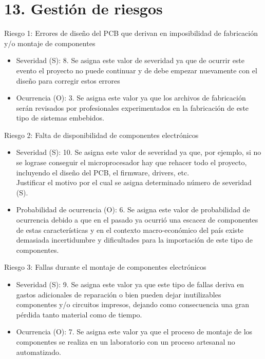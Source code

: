 \documentclass[
11pt, %
]{charter}
\begin{document}
\section{13. Gestión de riesgos}
\label{sec:riesgos}


Riesgo 1: Errores de diseño del PCB que derivan en imposibilidad de fabricación y/o montaje de componentes
\begin{itemize}
	\item Severidad (S): 8. Se asigna este valor de severidad ya que de ocurrir este evento el proyecto no puede continuar y de debe empezar nuevamente con el diseño para corregir estos errores
	\item Ocurrencia (O): 3. Se asigna este valor ya que los archivos de fabricación serán revisados por profesionales experimentados en la fabricación de este tipo de sistemas embebidos.
\end{itemize}

 
Riesgo 2: Falta de disponibilidad de componentes electrónicos
\begin{itemize}
	\item Severidad (S): 10. Se asigna este valor de severidad ya que, por ejemplo, si no se lograse conseguir el microprocesador hay que rehacer todo el proyecto, incluyendo el diseño del PCB, el firmware, drivers, etc.\\
	Justificar el motivo por el cual se asigna determinado número de severidad (S).
	\item Probabilidad de ocurrencia (O): 6. Se asigna este valor de probabilidad de ocurrencia debido a que en el pasado ya ocurrió una escacez de componentes de estas características y en el contexto macro-económico del país existe demasiada incertidumbre y dificultades para la importación de este tipo de componentes.\\
	
\end{itemize}   

Riesgo 3: Fallas durante el montaje de componentes electrónicos
\begin{itemize}
	\item Severidad (S): 9. Se asigna este valor ya que este tipo de fallas deriva en gastos adicionales de reparación o bien pueden dejar inutilizables componentes y/o circuitos impresos, dejando como consecuencia una gran pérdida tanto material como de tiempo.
	\item Ocurrencia (O): 7. Se asigna este valor ya que el proceso de montaje de los componentes se realiza en un laboratorio con un proceso artesanal no automatizado.
\end{itemize}
\end{document}
